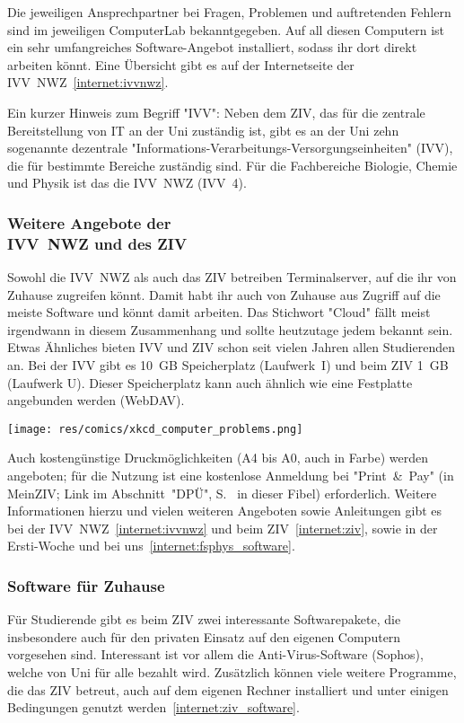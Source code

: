\begin{multicols}{2}
Die jeweiligen Ansprechpartner bei Fragen, Problemen und auftretenden Fehlern sind im jeweiligen ComputerLab bekanntgegeben. Auf all diesen Computern ist ein sehr umfangreiches Software-Angebot installiert, sodass ihr dort direkt arbeiten könnt. Eine Übersicht gibt es auf der Internetseite der IVV~NWZ~\cref{internet:ivvnwz}.

Ein kurzer Hinweis zum Begriff "IVV": Neben dem ZIV, das für die zentrale Bereitstellung von IT an der Uni zuständig ist, gibt es an der Uni zehn  sogenannte dezentrale "Informations-Verarbeitungs-Versorgungseinheiten" (IVV), die für bestimmte Bereiche zuständig sind. Für die Fachbereiche Biologie, Chemie und Physik ist das die IVV~NWZ (IVV~4).

\subsubsection*{Weitere Angebote der\\IVV~NWZ und des ZIV}
Sowohl die IVV~NWZ als auch das ZIV betreiben Terminalserver, auf die ihr von Zuhause zugreifen könnt. Damit habt ihr auch von Zuhause aus Zugriff auf die meiste Software und könnt damit arbeiten. Das Stichwort "Cloud" fällt meist irgendwann in diesem Zusammenhang und sollte heutzutage jedem bekannt sein. Etwas Ähnliches bieten IVV und ZIV schon seit vielen Jahren allen Studierenden an. Bei der IVV gibt es 10~GB Speicherplatz (Laufwerk~I) und beim ZIV 1~GB (Laufwerk U). Dieser Speicherplatz kann auch ähnlich wie eine Festplatte angebunden werden (WebDAV).

\texttt{[image: res/comics/xkcd\_computer\_problems.png]}

Auch kostengünstige Druckmöglichkeiten (A4 bis A0, auch in Farbe) werden angeboten; für die Nutzung ist eine kostenlose Anmeldung bei "Print~\&~Pay" (in MeinZIV; Link im Abschnitt~"DPÜ", S.~\pageref{dpü} in dieser Fibel) erforderlich. Weitere Informationen hierzu und vielen weiteren Angeboten sowie Anleitungen gibt es bei der IVV~NWZ~\cref{internet:ivvnwz} und beim ZIV~\cref{internet:ziv}, sowie in der Ersti-Woche und bei uns~\cref{internet:fsphys_software}.

\subsubsection*{Software für Zuhause}
Für Studierende gibt es beim ZIV zwei interessante Softwarepakete, die insbesondere auch für den privaten Einsatz auf den eigenen Computern vorgesehen sind. Interessant ist vor allem die Anti-Virus-Software (Sophos), welche von Uni für alle bezahlt wird. Zusätzlich können viele weitere Programme, die das ZIV betreut, auch auf dem eigenen Rechner installiert und unter einigen Bedingungen genutzt werden~\cref{internet:ziv_software}.


\end{multicols}
